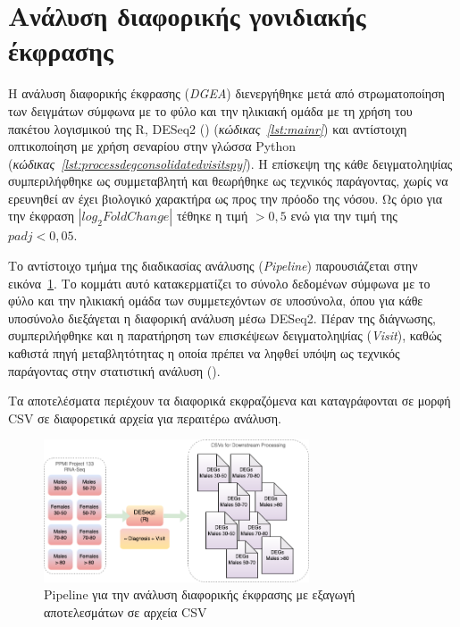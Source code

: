 \documentclass[12pt]{report}
\begin{document}
    \section{Ανάλυση διαφορικής γονιδιακής έκφρασης}
        \par
            Η ανάλυση διαφορικής έκφρασης (\emph{DGEA}) διενεργήθηκε μετά από στρωματοποίηση των δειγμάτων σύμφωνα με το φύλο και την ηλικιακή ομάδα με τη χρήση του πακέτου λογισμικού της R, DESeq2 (\emph{\cite{Love2014ModeratedDESeq2}}) (\emph{κώδικας~\ref{lst:mainr}}) και αντίστοιχη οπτικοποίηση με χρήση σεναρίου στην γλώσσα Python (\emph{κώδικας~\ref{lst:processdegconsolidatedvisitspy}}). Η επίσκεψη της κάθε δειγματοληψίας συμπεριλήφθηκε ως συμμεταβλητή και θεωρήθηκε ως τεχνικός παράγοντας, χωρίς να ερευνηθεί αν έχει βιολογικό χαρακτήρα ως προς την πρόοδο της νόσου. Ως όριο για την έκφραση $|log_2FoldChange|$ τέθηκε η τιμή $>0,5$ ενώ για την τιμή της $padj<0,05$. 
        \par
            Το αντίστοιχο τμήμα της διαδικασίας ανάλυσης (\emph{Pipeline}) παρουσιάζεται στην εικόνα~\ref{fig:msci-big-pic-DEGs-blocks}. Το κομμάτι αυτό κατακερματίζει το σύνολο δεδομένων σύμφωνα με το φύλο και την ηλικιακή ομάδα των συμμετεχόντων σε υποσύνολα, όπου για κάθε υποσύνολο διεξάγεται η διαφορική ανάλυση μέσω DESeq2. Πέραν της διάγνωσης, συμπεριλήφθηκε και η παρατήρηση των επισκέψεων δειγματοληψίας (\emph{Visit}), καθώς καθιστά πηγή μεταβλητότητας η οποία πρέπει να ληφθεί υπόψη ως τεχνικός παράγοντας στην στατιστική ανάλυση (\emph{\cite{Love2016DifferentialPackage}}).
        \par
            Τα αποτελέσματα περιέχουν τα διαφορικά εκφραζόμενα και καταγράφονται σε μορφή CSV σε διαφορετικά αρχεία για περαιτέρω ανάλυση.
            \begin{figure}[h]
                \centering
                \includegraphics[width=0.7\textwidth]{Chapter-3/msci-big-pic-DEGs-blocks.png}
                \caption{Pipeline για την ανάλυση διαφορικής έκφρασης με εξαγωγή αποτελεσμάτων σε αρχεία CSV}
                \label{fig:msci-big-pic-DEGs-blocks}
            \end{figure}
\end{document}
